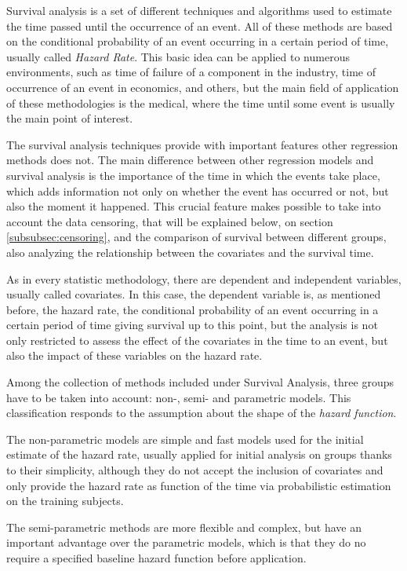 \documentclass[11pt]{book} %
\begin{document}
    Survival analysis is a set of different techniques and algorithms used to estimate the time passed until the occurrence of an event. All of these methods are based on the conditional probability of an event occurring in a certain period of time, usually called \emph{Hazard Rate}. This basic idea can be applied to numerous environments, such as time of failure of a component in the industry, time of occurrence of an event in economics, and others, but the main field of application of these methodologies is the medical, where the time until some event is usually the main point of interest.

    The survival analysis techniques provide with important features other regression methods does not. The main difference between other regression models and survival analysis is the importance of the time in which the events take place, which adds information not only on whether the event has occurred or not, but also the moment it happened. This crucial feature makes possible to take into account the data censoring, that will be explained below, on section \ref{subsubsec:censoring}, and the comparison of survival between different groups, also analyzing the relationship between the covariates and the survival time.

    As in every statistic methodology, there are dependent and independent variables, usually called covariates. In this case, the dependent variable is, as mentioned before, the hazard rate, the conditional probability of an event occurring in a certain period of time giving survival up to this point, but the analysis is not only restricted to assess the effect of the covariates in the time to an event, but also the impact of these variables on the hazard rate.

    Among the collection of methods included under Survival Analysis, three groups have to be taken into account: non-, semi- and parametric models. This classification responds to the assumption about the shape of the \emph{hazard function}.

    The non-parametric models are simple and fast models used for the initial estimate of the hazard rate, usually applied for initial analysis on groups thanks to their simplicity, although they do not accept the inclusion of covariates and only provide the hazard rate as function of the time via probabilistic estimation on the training subjects.

    The semi-parametric methods are more flexible and complex, but have an important advantage over the parametric models, which is that they do no require a specified baseline hazard function before application.
\end{document}
